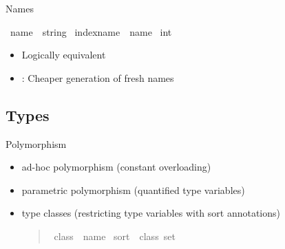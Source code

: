 \begin{frame}{Names}
    \begin{isabelle}
        \ name\ {\isacharequal}\ string \isanewline
        \ indexname\ {\isacharequal}\ name {\isasymtimes}\ int
    \end{isabelle}
    \begin{itemize}
        \item Logically equivalent
        \item {}: Cheaper generation of fresh names
    \end{itemize}
\end{frame}


\subsection{Types}
\begin{frame}{Polymorphism}
  \begin{itemize}[<+->]
    \item ad-hoc polymorphism (constant overloading)
        \begin{quote}
        \end{quote}
    \item parametric polymorphism (quantified type variables)
        \begin{quote}
        \end{quote}
        \phantom{1em}
        \begin{quote}
        \end{quote}
    \item type classes (restricting type variables with sort annotations)
        \begin{quote}
            \begin{isabelle}
                \ class\ {\isacharequal}\ name \isanewline
                \ sort\ {\isacharequal}\ class\ set
            \end{isabelle}
        \end{quote}
  \end{itemize}
\end{frame}

